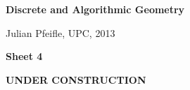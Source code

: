 \documentclass[11pt]{amsart}
\begin{document}
\begin{center}
\textbf{\sffamily
   Discrete and Algorithmic Geometry }

\medskip
   Julian Pfeifle,
   UPC, 2013 \mbox{}
\end{center}

\bigskip

\begin{center}
  \textbf{\sffamily Sheet 4}

\bigskip
\textbf{\sffamily UNDER CONSTRUCTION}

\end{center}

\bigskip



\end{document}
